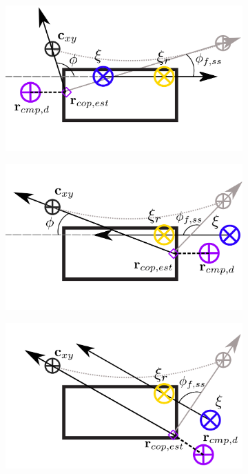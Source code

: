 \begin{figure}[h]
  \begin{subfigure}{0.5\textwidth}
  \centering
  \includegraphics[width=.8\linewidth]{STYLESTUFF/ICPplanStartSSPhiViz.png}
   \caption{}
    \label{fig:phiViza}
  \end{subfigure}
  \begin{subfigure}{0.5\textwidth}
    \centering
  \includegraphics[width=.8\linewidth]{STYLESTUFF/ICPplanStartSSPhiVizNegError.png}
  \caption{}
   \label{fig:phiVizb}
  \end{subfigure}
  \begin{subfigure}{0.5\textwidth}
    \centering
  \includegraphics[width=.8\linewidth]{STYLESTUFF/ICPplanStartSSPhiViz0.png}

\end{subfigure}
\end{figure}
